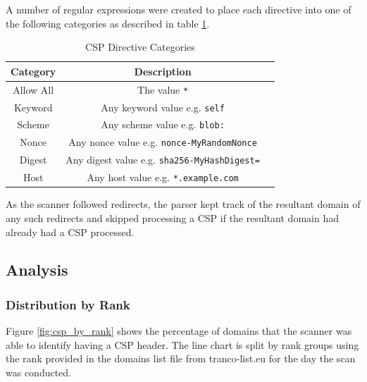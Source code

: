 \documentclass{mscreport}
\begin{document}
\vspace{0.3cm} \noindent
A number of regular expressions were created to place each directive into one of the following categories as described in table \ref{table:directive_categories}.


\begin{table}[t]
  \begin{center}
    \begin{tabular}{|c|c|c|}  %
      \hline
      \textbf{Category} & \textbf{Description}\\
      \hline
      Allow All & The value \texttt{*}\\
      \hline
      Keyword & Any keyword value e.g. \texttt{self}\\
      \hline
      Scheme & Any scheme value e.g. \texttt{blob:}\\
      \hline
      Nonce & Any nonce value e.g. \texttt{nonce-MyRandomNonce}\\
      \hline
      Digest & Any digest value e.g. \texttt{sha256-MyHashDigest=}\\
      \hline
      Host & Any host value e.g. \texttt{*.example.com}\\
      \hline
    \end{tabular}
    \caption{CSP Directive Categories}
    \label{table:directive_categories} %
  \end{center}
\end{table}

\vspace{0.3cm} \noindent
As the scanner followed redirects, the parser kept track of the resultant domain of any such redirects and skipped processing a CSP if the resultant domain had already had a CSP processed.


\newpage

\subsection{Analysis}

\subsubsection{Distribution by Rank}

\noindent
Figure \ref{fig:csp_by_rank} shows the percentage of domains that the scanner was able to identify having a CSP header. The line chart is split by rank groups using the rank provided in the domains list file from tranco-list.eu for the day the scan was conducted.
\end{document}
